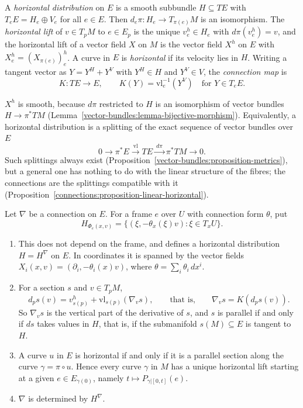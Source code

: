 \begin{definition}\label{connections:definition-horizontal}
A \emph{horizontal distribution} on $E$ is a smooth subbundle $H \subseteq TE$ with $T_eE = H_e \oplus V_e$ for all $e \in E$. Then $d_e\pi \colon H_e \to T_{\pi(e)}M$ is an isomorphism.
The \emph{horizontal lift} of $v \in T_pM$ to $e \in E_p$ is the unique $v^h_e \in H_e$ with $d\pi(v^h_e) = v$, and the horizontal lift of a vector field $X$ on $M$ is the vector field
$X^h$ on $E$ with $X^h_e = (X_{\pi(e)})^h_e$. A curve in $E$ is \emph{horizontal} if its velocity lies in $H$. Writing a tangent vector as $Y = Y^H + Y^V$ with $Y^H \in H$ and $Y^V \in V$, the
\emph{connection map} is
\[
K \colon TE \to E, \qquad K(Y) = \mathrm{vl}_e^{-1}(Y^V) \quad\text{for } Y \in T_eE .
\]
\end{definition}

$X^h$ is smooth, because $d\pi$ restricted to $H$ is an isomorphism of vector bundles $H \to \pi^*TM$ (Lemma~\ref{vector-bundles:lemma-bijective-morphism}). Equivalently, a horizontal distribution
is a splitting of the exact sequence of vector bundles over $E$
\[
0 \to \pi^*E \xrightarrow{\ \mathrm{vl}\ } TE \xrightarrow{\ d\pi\ } \pi^*TM \to 0 .
\]
Such splittings always exist (Proposition~\ref{vector-bundles:proposition-metrics}), but a general one has nothing to do with the linear structure of the fibres; the connections are the
splittings compatible with it (Proposition~\ref{connections:proposition-linear-horizontal}).

\begin{proposition}\label{connections:proposition-horizontal}
Let $\nabla$ be a connection on $E$. For a frame $e$ over $U$ with connection form $\theta$, put
\[
H_{\Phi_e(x, v)} = \{(\xi, -\theta_x(\xi)v) : \xi \in T_xU\}.
\]
\begin{enumerate}
\item This does not depend on the frame, and defines a horizontal distribution $H = H^\nabla$ on $E$. In coordinates it is spanned by the vector fields
$X_i(x, v) = (\partial_i, -\theta_i(x)v)$, where $\theta = \sum_i\theta_i\,dx^i$.
\item For a section $s$ and $v \in T_pM$,
\[
d_ps(v) = v^h_{s(p)} + \mathrm{vl}_{s(p)}(\nabla_vs), \qquad\text{that is,}\qquad \nabla_vs = K(d_ps(v)).
\]
So $\nabla_vs$ is the vertical part of the derivative of $s$, and $s$ is parallel if and only if $ds$ takes values in $H$, that is, if the submanifold $s(M) \subseteq E$ is tangent to $H$.
\item A curve $u$ in $E$ is horizontal if and only if it is a parallel section along the curve $\gamma = \pi \circ u$. Hence every curve $\gamma$ in $M$ has a unique horizontal lift
starting at a given $e \in E_{\gamma(0)}$, namely $t \mapsto P_{\gamma|[0, t]}(e)$.
\item $\nabla$ is determined by $H^\nabla$.
\end{enumerate}
\end{proposition}

